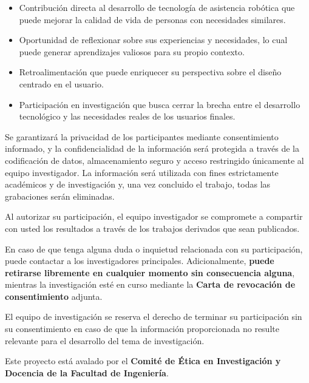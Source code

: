 \begin{itemize}
\item Contribución directa al desarrollo de tecnología de asistencia robótica que puede mejorar la calidad de vida de personas con necesidades similares.
\item Oportunidad de reflexionar sobre sus experiencias y necesidades, lo cual puede generar aprendizajes valiosos para su propio contexto.
\item Retroalimentación que puede enriquecer su perspectiva sobre el diseño centrado en el usuario.
\item Participación en investigación que busca cerrar la brecha entre el desarrollo tecnológico y las necesidades reales de los usuarios finales.
\end{itemize}

Se garantizará la privacidad de los participantes mediante consentimiento informado, y la confidencialidad de la información será protegida a través de la codificación de datos, almacenamiento seguro y acceso restringido únicamente al equipo investigador. La informaci\'on ser\'a utilizada con fines estrictamente acad\'emicos y de investigaci\'on y, una vez concluido el trabajo, todas las grabaciones serán eliminadas.

Al autorizar su participación, el equipo investigador se compromete a compartir con usted los resultados a través de los trabajos derivados que sean publicados.

En caso de que tenga alguna duda o inquietud relacionada con su participación, puede contactar a los investigadores principales. Adicionalmente, \textbf{puede retirarse libremente en cualquier momento sin consecuencia alguna}, mientras la investigación esté en curso mediante la \textbf{Carta de revocación de consentimiento} adjunta.

El equipo de investigación se reserva el derecho de terminar su participación sin su consentimiento en caso de que la información proporcionada no resulte relevante para el desarrollo del tema de investigación.

Este proyecto está avalado por el \textbf{Comité de Ética en Investigación y Docencia de la Facultad de Ingeniería}.
